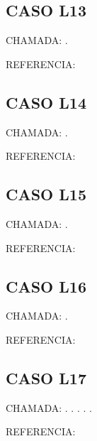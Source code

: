 \documentclass{undftex}
\begin{document}
\begin{refsection}\section*{CASO L13} CHAMADA: . \textcite{l13b}\par REFERENCIA:\par\printbibliography[heading=none,check=undfconsultadas]\end{refsection}\clearpage
\begin{refsection}\section*{CASO L14} CHAMADA: . \textcite{l14b}\par REFERENCIA:\par\printbibliography[heading=none,check=undfconsultadas]\end{refsection}\clearpage
\begin{refsection}\section*{CASO L15} CHAMADA: . \textcite{l15c}\par REFERENCIA:\par\printbibliography[heading=none,check=undfconsultadas]\end{refsection}\clearpage
\begin{refsection}\section*{CASO L16} CHAMADA: . \textcite{l15a}\par REFERENCIA:\par\printbibliography[heading=none,check=undfconsultadas]\end{refsection}\clearpage
\begin{refsection}\section*{CASO L17} CHAMADA: . \textcite{l15c}. . . . \par REFERENCIA:\par\printbibliography[heading=none,check=undfconsultadas]\end{refsection}\clearpage
\end{document}
